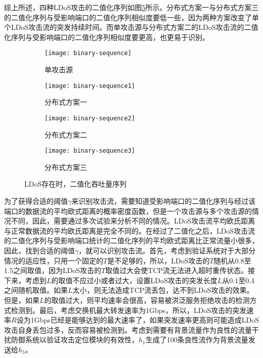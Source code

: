 综上所述，四种LDoS攻击的二值化序列如图\ref{fig:binary-sequence-all}所示。分布式方案一与分布式方案三的二值化序列与受影响端口的二值化序列相似度要低一些，因为两种方案改变了单个LDoS攻击流的突发持续时间。而单攻击源与分布式方案二的LDoS攻击流的二值化序列与受影响端口的二值化序列相似度要更高，也更易于识别。


\begin{figure}
    \begin{subfigure}{.49\textwidth}
        \centering
        \texttt{[image: binary-sequence]}
        \caption{单攻击源}
        \label{fig:binary-sequence-single}
    \end{subfigure}
    \begin{subfigure}{.49\textwidth}
        \centering
        \texttt{[image: binary-sequence1]}
        \caption{分布式方案一}
        \label{fig:binary-sequence-2h-mod1}
    \end{subfigure}

    \begin{subfigure}{.49\textwidth}
        \centering
        \texttt{[image: binary-sequence2]}
        \caption{分布式方案二}
        \label{fig:binary-sequence-2h-mod2}
    \end{subfigure}
    \begin{subfigure}{.49\textwidth}
        \centering
        \texttt{[image: binary-sequence3]}
        \caption{分布式方案三}
        \label{fig:binary-sequence-2h-mod3}
    \end{subfigure}


    \caption{LDoS存在时，二值化吞吐量序列}
    \label{fig:binary-sequence-all}
\end{figure}




为了获得合适的阈值$\gamma$来识别攻击流，需要知道受影响端口的二值化序列与经过该端口的数据流的平均欧式距离的概率密度函数，但是一个攻击源与多个攻击源的情况不同，因此，需要通过多次试验来分析不同的情况。LDoS攻击流平均欧氏距离与正常数据流的平均欧氏距离是完全不同的。在经过了二值化之后，LDoS攻击流的二值化序列与受影响端口统计的二值化序列的平均欧式距离比正常流量小很多，因此，找到合适的阈值$\gamma$，就可以识别攻击流。首先，考虑到验证系统对于大部分情况的适应性，只用一个固定的$T$是不足够的，所以，LDoS攻击的$T$随机从0.8至1.5之间取值，因为LDoS攻击的$T$取值过大会使TCP流无法进入超时重传状态。接下来，考虑到$L$的取值不应过小或者过大，设置LDoS攻击的突发长度$L$从0.1至0.4之间随机取值。如果$L$太小，则无法造成TCP流丢包，达不到LDoS攻击的效果。但是，如果$L$的取值过大，则平均速率会很高，容易被洪泛服务拒绝攻击的检测方式检测到。最后，考虑交换机最大转发速率为1Gbps，所以，LDoS攻击的突发速率$R$设为1Gbps已经是能够达到的最大速率了，如果突发速率更高则可能造成LDoS攻击自身丢包过多，反而容易被检测到。考虑到需要有背景流量作为良性的流量干扰防御系统以验证攻击定位模块的有效性，$h_1$生成了100条良性流作为背景流量发送给$h_5$。

